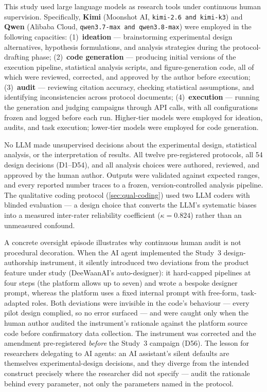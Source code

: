 \documentclass[12pt,a4paper]{article}
\begin{document}
This study used large language models as research tools under continuous human
supervision. Specifically, \textbf{Kimi} (Moonshot AI, \texttt{kimi-2.6 and kimi-k3}) and
\textbf{Qwen} (Alibaba Cloud, \texttt{qwen3.7-max and qwen3.8-max}) were employed in the
following capacities: (1)~\textbf{ideation} --- brainstorming experimental
design alternatives, hypothesis formulations, and analysis strategies during the
protocol-drafting phase; (2)~\textbf{code generation} --- producing initial
versions of the execution pipeline, statistical analysis scripts, and
figure-generation code, all of which were reviewed, corrected, and approved by
the author before execution; (3)~\textbf{audit} --- reviewing citation accuracy,
checking statistical assumptions, and identifying inconsistencies across
protocol documents; (4)~\textbf{execution} --- running the generation and
judging campaigns through API calls, with all configurations frozen and logged
before each run. Higher-tier models were employed for ideation, audits, and
task execution; lower-tier models were employed for code generation.

No LLM made unsupervised decisions about the experimental design, statistical
analysis, or the interpretation of results. All twelve pre-registered protocols,
all 54 design decisions (D1--D54), and all analysis choices were authored,
reviewed, and approved by the human author. Outputs were
validated against expected ranges, and every reported number traces to a frozen,
version-controlled analysis pipeline. The qualitative coding protocol
(\cref{sec:qual-coding}) used two LLM coders with blinded evaluation --- a
design choice that converts the LLM's systematic biases into a measured
inter-rater reliability coefficient ($\kappa = 0.824$) rather than an unmeasured
confound.

A concrete oversight episode illustrates why continuous human audit is not
procedural decoration. When the AI agent implemented the Study~3
design-authorship instrument, it silently introduced two deviations from the
product feature under study (DeeWaanAI's auto-designer): it hard-capped
pipelines at four steps (the platform allows up to seven) and wrote a bespoke
designer prompt, whereas the platform uses a fixed internal prompt with
free-form, task-adapted roles. Both deviations were invisible in the code's
behaviour --- every pilot design complied, so no error surfaced --- and were
caught only when the human author audited the instrument's rationale against
the platform source code before confirmatory data collection. The instrument
was corrected and the amendment pre-registered \emph{before} the Study~3
campaign (D56). The lesson for researchers delegating to AI agents: an AI
assistant's silent defaults are themselves experimental-design decisions, and
they diverge from the intended construct precisely where the researcher did
not specify --- audit the rationale behind every parameter, not only the
parameters named in the protocol.
\end{document}
